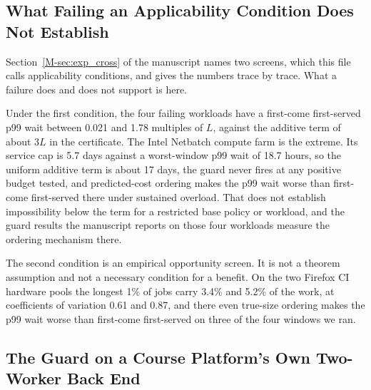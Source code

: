 \documentclass[mathematics,supfile,submit,moreauthors]{Definitions/mdpi}
\newcommand{\devnum}[1]{#1}
\begin{document}
\subsection{What Failing an Applicability Condition Does Not Establish}
\label{sec:supp_applicability}

Section~\ref*{M-sec:exp_cross} of the manuscript names two screens, which this file calls
applicability conditions, and gives the numbers trace by trace. What a failure does and
does not support is here.

Under the first condition, the four failing workloads have a first-come first-served
p99 wait between \devnum{0.021} and \devnum{1.78} multiples of $L$, against the
additive term of about \devnum{3}$L$ in the certificate. The Intel Netbatch compute
farm \cite{netbatch2012trace,shai2014netbatch} is the extreme. Its service cap is
\devnum{5.7} days against a worst-window p99 wait of \devnum{18.7} hours, so the
uniform additive term is about \devnum{17} days, the guard never fires at any
positive budget tested, and predicted-cost ordering makes the p99 wait worse than
first-come first-served there under sustained overload. That does not establish
impossibility below the term for a restricted base policy or workload, and the guard
results the manuscript reports on those four workloads measure the ordering mechanism
there.

The second condition is an empirical opportunity screen. It is not a theorem
assumption and not a necessary condition for a benefit. On the two Firefox CI
hardware pools \cite{taskcluster_docs,treeherder_docs} the longest \devnum{1\%} of
jobs carry \devnum{3.4\%} and \devnum{5.2\%} of the work, at coefficients of
variation \devnum{0.61} and \devnum{0.87}, and there even true-size ordering makes
the p99 wait worse than first-come first-served on three of the four windows we ran.

\subsection{The Guard on a Course Platform's Own Two-Worker Back End}
\label{sec:supp_platform}
\end{document}
